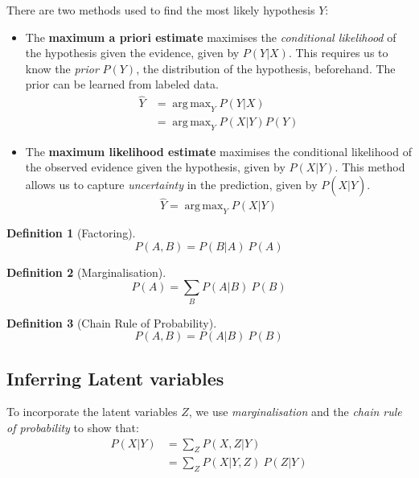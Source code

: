 \documentclass[12pt,a4paper,twoside,openright]{report}
\DeclareMathOperator*{\argmax}{arg\,max}
\theoremstyle{definition}
\newtheorem{definition}{Definition}[section]
\begin{document}
There are two methods used to find the most likely hypothesis $Y$:
\begin{itemize}
  \item  The \textbf{maximum a priori estimate} maximises the \textit{conditional likelihood} of the hypothesis given the evidence, given by $P(Y|X)$. This requires us to know the \textit{prior} $P(Y)$, the distribution of the hypothesis, beforehand. The prior can be learned from labeled data.
    \begin{equation}
      \begin{align}
        \hat{Y} &= \argmax_Y P(Y|X) \\
                &= \argmax_Y P(X|Y)P(Y)
      \end{align}
      \label{eq:map}
    \end{equation}
  \item  The \textbf{maximum likelihood estimate} maximises the conditional likelihood of the observed evidence given the hypothesis, given by $P(X|Y)$. This method allows us to capture \textit{uncertainty} in the prediction, given by $P(X|\hat{Y})$. 
    \begin{equation}
      \hat{Y} = \argmax_Y P(X|Y)
      \label{eq:mle}
    \end{equation}
\end{itemize}

\begin{definition}[Factoring]
\begin{equation}
  P(A,B) = P(B|A)~P(A)
  \label{eq:bayesRule}
\end{equation}
\end{definition}

\begin{definition}[Marginalisation]
\begin{equation}
  P(A) = \sum\limits_B P(A|B)~P(B)
  \label{eq:marginalisation}
\end{equation}
\end{definition}

\begin{definition}[Chain Rule of Probability]
\begin{equation}
  P(A,B) = P(A|B)~P(B)
  \label{eq:chainRule}
\end{equation}
\end{definition}

\subsection{Inferring Latent variables}
To incorporate the latent variables $Z$, we use \textit{marginalisation} and the \textit{chain rule of probability} to show that: 
\begin{equation}
  \begin{align*}
    P(X|Y) &= \sum\limits_Z P(X,Z|Y) \\
           &= \sum\limits_Z P(X|Y,Z)~P(Z|Y) 
  \end{align*}
  \label{eq:}
\end{equation}
\end{document}
